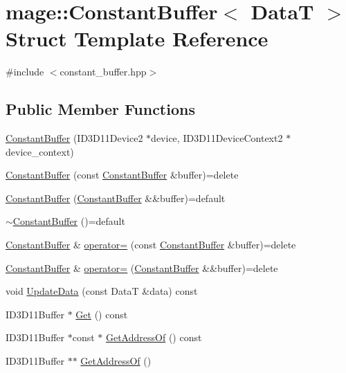 \hypertarget{structmage_1_1_constant_buffer}{}\section{mage\+:\+:Constant\+Buffer$<$ DataT $>$ Struct Template Reference}
\label{structmage_1_1_constant_buffer}


{\ttfamily \#include $<$constant\+\_\+buffer.\+hpp$>$}

\subsection*{Public Member Functions}
\begin{DoxyCompactItemize}
\item 
\hyperlink{structmage_1_1_constant_buffer_a19be787da1f12521a901821e93cd6d70}{Constant\+Buffer} (I\+D3\+D11\+Device2 $\ast$device, I\+D3\+D11\+Device\+Context2 $\ast$device\+\_\+context)
\item 
\hyperlink{structmage_1_1_constant_buffer_a67fe42cb52e63e38474b6c65341fbe82}{Constant\+Buffer} (const \hyperlink{structmage_1_1_constant_buffer}{Constant\+Buffer} \&buffer)=delete
\item 
\hyperlink{structmage_1_1_constant_buffer_a851570293d8eeb47f83749f8f54864ee}{Constant\+Buffer} (\hyperlink{structmage_1_1_constant_buffer}{Constant\+Buffer} \&\&buffer)=default
\item 
\hyperlink{structmage_1_1_constant_buffer_a874e9507ea3b6d2f630f061c2fc6d2d0}{$\sim$\+Constant\+Buffer} ()=default
\item 
\hyperlink{structmage_1_1_constant_buffer}{Constant\+Buffer} \& \hyperlink{structmage_1_1_constant_buffer_acb1a4f4b656073609075b5e89dea6973}{operator=} (const \hyperlink{structmage_1_1_constant_buffer}{Constant\+Buffer} \&buffer)=delete
\item 
\hyperlink{structmage_1_1_constant_buffer}{Constant\+Buffer} \& \hyperlink{structmage_1_1_constant_buffer_ad050b1f0f03a5fcd2b51977a744781a3}{operator=} (\hyperlink{structmage_1_1_constant_buffer}{Constant\+Buffer} \&\&buffer)=delete
\item 
void \hyperlink{structmage_1_1_constant_buffer_a535429ca9cf81b44907b581324854392}{Update\+Data} (const DataT \&data) const
\item 
I\+D3\+D11\+Buffer $\ast$ \hyperlink{structmage_1_1_constant_buffer_ab8f6a3a3e1f4e009b6ab2aa2b9569030}{Get} () const
\item 
I\+D3\+D11\+Buffer $\ast$const  $\ast$ \hyperlink{structmage_1_1_constant_buffer_ad0bfc8d52f2e6442a9612052527b16ea}{Get\+Address\+Of} () const
\item 
I\+D3\+D11\+Buffer $\ast$$\ast$ \hyperlink{structmage_1_1_constant_buffer_a5ec29403969893822f364e26c22efcae}{Get\+Address\+Of} ()
\end{DoxyCompactItemize}
